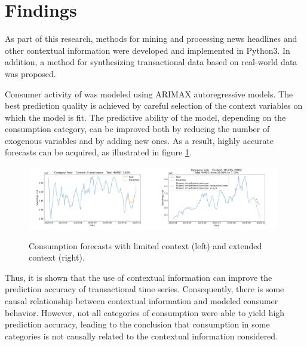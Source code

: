 \documentclass[13pt, a4paper]{article}
\begin{document}
\clearpage

\section{Findings} \label{f}

As part of this research, methods for mining and processing news headlines and other contextual information were developed and implemented in Python3. In addition, a method for synthesizing transactional data based on real-world data was proposed. 

Consumer activity of was modeled using ARIMAX autoregressive models. The best prediction quality is achieved by careful selection of the context variables on which the model is fit. The predictive ability of the model, depending on the consumption category, can be improved both by reducing the number of exogenous variables and by adding new ones. As a result, highly accurate forecasts can be acquired, as illustrated in figure \ref{fig:gr14}.
\begin{figure}[h!]\vspace*{4pt}
	\centerline{\includegraphics[width=0.49\textwidth]{./visuals/gr12.png}\hspace{1mm}\includegraphics[width=0.49\textwidth]{./visuals/gr13.png}}
\caption{Consumption forecasts with limited context (left) and extended context (right).}
\label{fig:gr14}
\end{figure}

Thus, it is shown that the use of contextual information can improve the prediction accuracy of transactional time series. Consequently, there is some causal relationship between contextual information and modeled consumer behavior. However, not all categories of consumption were able to yield high prediction accuracy, leading to the conclusion that consumption in some categories is not causally related to the contextual information considered.
\end{document}
